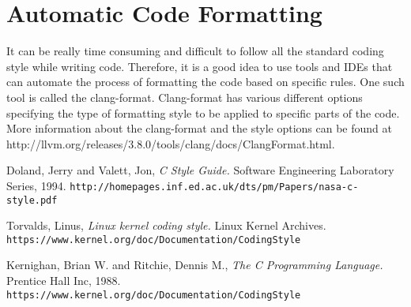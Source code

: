 \documentclass[11pt]{article}
\begin{document}
\section{Automatic Code Formatting}
It can be really time consuming and difficult to follow all the standard coding style while writing code. Therefore, it is a good idea to use tools and IDEs that can automate the process of formatting the code based on specific rules. One such tool is called the clang-format. Clang-format has various different options specifying the type of formatting style to be applied to specific parts of the code. More information about the clang-format and the style options can be found at http://llvm.org/releases/3.8.0/tools/clang/docs/ClangFormat.html.


\begin{thebibliography}{99} 
	\label{references}
	
	 Doland, Jerry and Valett, Jon, {\em C Style Guide.} Software Engineering Laboratory Series, 1994. \texttt{http://homepages.inf.ed.ac.uk/dts/pm/Papers/nasa-c-style.pdf}
	
	 Torvalds, Linus, {\em Linux kernel coding style.} Linux Kernel Archives. \texttt{https://www.kernel.org/doc/Documentation/CodingStyle}
	
	 Kernighan, Brian W. and Ritchie, Dennis M., {\em The C Programming Language.} Prentice Hall Inc, 1988. \texttt{https://www.kernel.org/doc/Documentation/CodingStyle}
	
\end{thebibliography}
\end{document}
